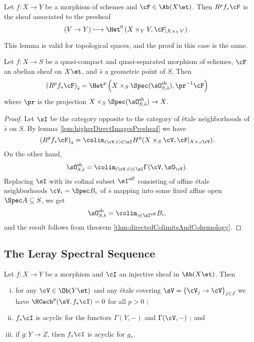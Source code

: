 \begin{lem} \label{lem:higherDirectImagesPresheaf}
Let $f: X\to Y$ be a morphism of schemes and $\cF\in \Ab(X\et)$. Then $R^pf_*\cF$ is the sheaf associated to the presheaf
$$
(V\to Y)\longmapsto \Het^0 \left(X\times_Y V, \cF|_{X\times_YV}\right).
$$
\end{lem}

This lemma is valid for topological spaces, and the proof in this case is the same.

\begin{thm} \label{thm:stalkOfHigherDirectImages}
Let $f: X\to S$ be a quasi-compact and quasi-separated morphism of schemes, $\cF$ an abelian sheaf on $X\et$, and $\bar s$ a geometric point of $S$. Then
$$
\left(R^pf_* \cF\right)_{\bar s} = \Het^p\left( X\times_S \Spec(\sO_{S, \bar s}^\mathrm{sh}), \pr^{-1}\cF\right)
$$
where $\pr$ is the projection $X\times_S \Spec(\sO_{S, \bar{s}}^\mathrm{sh}) \to X$.
\end{thm}

\begin{proof}
Let $\sI$ be the category opposite to the category of \'etale neighborhoods of $\bar s$ on $S$. By lemma \ref{lem:higherDirectImagesPresheaf} we have
$$
\left(R^pf_*\cF\right)_{\bar{s}} = \colim_{(\cV, \bar{v})\in \sI} H^p(X\times_S\cV, \cF|_{X\times_S\cV}).
$$
On the other hand, 
$$
\sO_{S, \bar{s}}^\mathrm{sh} = \colim_{(\cV, \bar v)\in \sI} \Gamma(\cV, \sO_\cV).
$$
Replacing $\sI$ with its cofinal subset $\sI^\mathrm{aff}$ consisting of affine \'etale neighborhoods $\cV_i= \Spec B_i$ of $\bar s$ mapping into some fixed affine open $\Spec A \subseteq S$, we get
$$
\sO_{S, \bar{s}}^\mathrm{sh} = \colim_{i\in \sI^\mathrm{aff}} B_i,
$$
and the result follows from theorem \ref{thm:directedColimitsAndCohomology}.
\end{proof}

\subsection{The Leray Spectral Sequence}

\begin{lem}
Let $f: X\to Y$ be a morphism and $\cI$ an injective sheaf in $\Ab(X\et)$. Then 
\begin{enumerate}[i.]
\item 
for any $\cV\in\Ob(Y\et)$ and any \'etale covering $\sV=\left\{\cV_j\to \cV\right\}_{j\in J}$  we have $\HCech^p(\sV, f_*\cI) = 0$ for all $p>0$ ;
\item 
$f_*\cI$ is acyclic for the functors $\Gamma(Y, -)$ and $\Gamma(\cV,-)$ ; and 
\item 
if $g: Y\to Z$, then $f_*\cI$ is acyclic for $g_*$.
\end{enumerate}
\end{lem}

